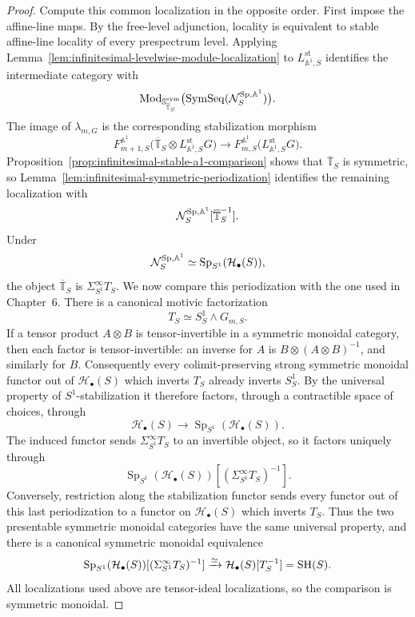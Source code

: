 \begin{proof}
Compute this common localization in the opposite order.  First impose the
affine-line maps.  By the free-level adjunction, locality is equivalent to
stable affine-line locality of every prespectrum level.  Applying
Lemma~\ref{lem:infinitesimal-levelwise-module-localization} to
\(L^{\mathrm{st}}_{\mathbb A^1,S}\) identifies the intermediate category with
\[
  \operatorname{Mod}_{\mathbb S_{\overline{\mathbb T}_S}^{\mathrm{sym}}}
  \bigl(\operatorname{SymSeq}(\mathcal N_S^{\mathrm{Sp},\mathbb A^1})\bigr).
\]
The image of \(\lambda_{m,G}\) is the corresponding stabilization morphism
\[
  F^{\mathbb A^1}_{m+1,S}
  \bigl(\overline{\mathbb T}_S\otimes
  L^{\mathrm{st}}_{\mathbb A^1,S}G\bigr)
  \longrightarrow
  F^{\mathbb A^1}_{m,S}
  \bigl(L^{\mathrm{st}}_{\mathbb A^1,S}G\bigr).
\]
Proposition~\ref{prop:infinitesimal-stable-a1-comparison} shows that
\(\overline{\mathbb T}_S\) is symmetric, so
Lemma~\ref{lem:infinitesimal-symmetric-periodization} identifies the remaining
localization with
\[
  \mathcal N_S^{\mathrm{Sp},\mathbb A^1}
  [\overline{\mathbb T}_S^{-1}].
\]
Under
\[
  \mathcal N_S^{\mathrm{Sp},\mathbb A^1}
  \simeq
  \operatorname{Sp}_{S^1}(\mathcal H_\bullet(S)),
\]
the object \(\overline{\mathbb T}_S\) is
\(\Sigma^\infty_{S^1}T_S\).  We now compare this periodization with the
one used in Chapter~6.  There is a canonical motivic factorization
\[
  T_S\simeq S^1_S\wedge G_{m,S}.
\]
If a tensor product \(A\otimes B\) is tensor-invertible in a symmetric
monoidal category, then each factor is tensor-invertible: an inverse for
\(A\) is \(B\otimes(A\otimes B)^{-1}\), and similarly for \(B\).
Consequently every colimit-preserving strong symmetric monoidal functor out of
\(\mathcal H_\bullet(S)\) which inverts \(T_S\) already inverts \(S^1_S\).
By the universal property of \(S^1\)-stabilization it therefore factors,
through a contractible space of choices, through
\[
  \mathcal H_\bullet(S)
  \longrightarrow
  \operatorname{Sp}_{S^1}(\mathcal H_\bullet(S)).
\]
The induced functor sends \(\Sigma^\infty_{S^1}T_S\) to an invertible object,
so it factors uniquely through
\[
  \operatorname{Sp}_{S^1}(\mathcal H_\bullet(S))
  [ (\Sigma^\infty_{S^1}T_S)^{-1}].
\]
Conversely, restriction along the stabilization functor sends every functor
out of this last periodization to a functor on \(\mathcal H_\bullet(S)\)
which inverts \(T_S\).  Thus the two presentable symmetric monoidal
categories have the same universal property, and there is a canonical
symmetric monoidal equivalence
\[
  \operatorname{Sp}_{S^1}(\mathcal H_\bullet(S))
  [ (\Sigma^\infty_{S^1}T_S)^{-1}]
  \xrightarrow{\simeq}
  \mathcal H_\bullet(S)[T_S^{-1}]
  =\mathrm{SH}(S).
\]
All localizations used above are tensor-ideal localizations, so the comparison
is symmetric monoidal.
\end{proof}

